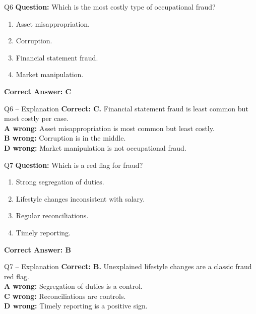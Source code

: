 \documentclass[aspectratio=169,10pt]{beamer}
\begin{document}
	\begin{frame}[t]{Q6}
		\small
		\textbf{Question:} Which is the most costly type of occupational fraud?
		\begin{enumerate}[label=\Alph*.,itemsep=1pt,topsep=2pt]
			\item Asset misappropriation.
			\item Corruption.
			\item Financial statement fraud.
			\item Market manipulation.
		\end{enumerate}
		\vspace{4pt}
		\textbf{Correct Answer: C}
	\end{frame}
	
	\begin{frame}[t]{Q6 -- Explanation}
		\small
		\textbf{Correct: C.} Financial statement fraud is least common but most costly per case. \\[4pt]
		\textbf{A wrong:} Asset misappropriation is most common but least costly. \\[2pt]
		\textbf{B wrong:} Corruption is in the middle. \\[2pt]
		\textbf{D wrong:} Market manipulation is not occupational fraud.
	\end{frame}
	
	\begin{frame}[t]{Q7}
		\small
		\textbf{Question:} Which is a red flag for fraud?
		\begin{enumerate}[label=\Alph*.,itemsep=1pt,topsep=2pt]
			\item Strong segregation of duties.
			\item Lifestyle changes inconsistent with salary.
			\item Regular reconciliations.
			\item Timely reporting.
		\end{enumerate}
		\vspace{4pt}
		\textbf{Correct Answer: B}
	\end{frame}
	
	\begin{frame}[t]{Q7 -- Explanation}
		\small
		\textbf{Correct: B.} Unexplained lifestyle changes are a classic fraud red flag. \\[4pt]
		\textbf{A wrong:} Segregation of duties is a control. \\[2pt]
		\textbf{C wrong:} Reconciliations are controls. \\[2pt]
		\textbf{D wrong:} Timely reporting is a positive sign.
	\end{frame}
	
\end{document}
